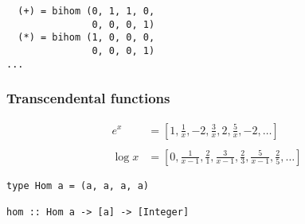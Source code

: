 \documentclass[11pt]{beamer}
\begin{document}
\begin{frame}[fragile]
\begin{verbatim}
  (+) = bihom (0, 1, 1, 0,
               0, 0, 0, 1)
  (*) = bihom (1, 0, 0, 0,
               0, 0, 0, 1)
...
\end{verbatim}
\end{frame}

\begin{frame}[fragile]
\frametitle{Transcendental functions}
\pause
\begin{align*}
e^x &= [1, \frac{1}{x}, -2, \frac{3}{x}, 2, \frac{5}{x}, -2, \dots] \\
~\\
\log x &= [0, \frac{1}{x-1}, \frac{2}{1}, \frac{3}{x-1}, \frac{2}{3}, \frac{5}{x-1}, \frac{2}{5}, \dots]
\end{align*}
\pause
\begin{verbatim}
type Hom a = (a, a, a, a)

hom :: Hom a -> [a] -> [Integer]
\end{verbatim}
\end{frame}

\begin{frame}
\nocite{*}
\printbibliography
\end{frame}
\end{document}
